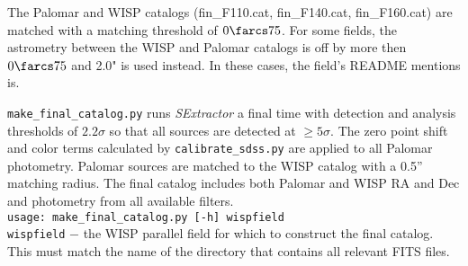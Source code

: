 \documentclass{article}
\begin{document}
The Palomar and WISP catalogs (fin\_F110.cat, fin\_F140.cat, fin\_F160.cat)
are matched with a matching threshold of $0\farcs75$. For some fields, 
the astrometry between the WISP and Palomar catalogs is off by more then 
$0\farcs75$ and 2.0" is used instead. In these cases, the field's 
README mentions is. 


\texttt{make\_final\_catalog.py} runs \textit{SExtractor} a final time
with detection and analysis thresholds of $2.2\sigma$ so that all sources
are detected at $\geq5\sigma$. The zero point shift and color terms 
calculated by \texttt{calibrate\_sdss.py} are applied to all Palomar
photometry. Palomar sources are matched to the WISP catalog with a 0.5''
matching radius. The final catalog includes both Palomar and WISP
RA and Dec and photometry from all available filters.\\

\texttt{usage: make\_final\_catalog.py [-h] wispfield} \\

\texttt{wispfield} $-$ \hangindent=2.7cm the WISP parallel field for which
to construct the final catalog. This must match the name of the directory that
contains all relevant FITS files.\\
\end{document}
